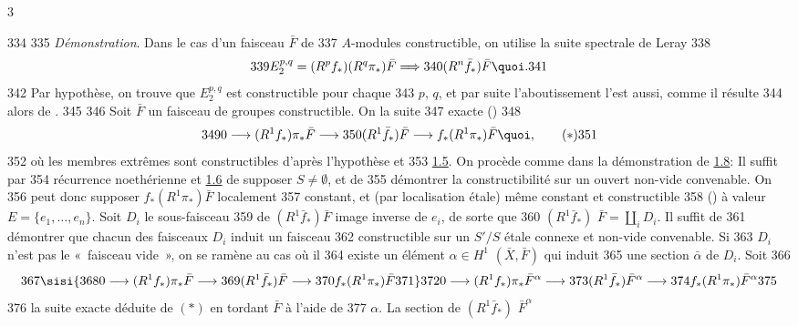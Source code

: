 3	\documentclass[10pt]{../fichiers-configuration-latex/smfart}
\begin{document}
   334	
   335		\emph{Démonstration}. Dans le cas d'un faisceau $\bar{F}$ de
   337	$A$-modules constructible, on utilise la suite spectrale de Leray
   338	$$
   339	E^{p,q}_2=(R^{p}f_{\ast})(R^{q}\pi_{\ast}) \bar{F}\Longrightarrow 
   340	(R^{n}\bar{f}_{\ast})\bar{F}{\quoi}.
   341	$$
   342	Par hypothèse, on trouve que $E^{p,q}_2$ est constructible pour chaque
   343	$p$, $q$, et par suite l'aboutissement l'est aussi, comme il résulte
   344	alors de .
   345	
   346	Soit $\bar{F}$ un faisceau de groupes constructible. On la suite
   347	exacte ()
   348	\begin{equation*}
   349	0\longrightarrow (R^{1}f_{\ast})\pi_{\ast}\bar{F}\longrightarrow
   350	(R^{1}\bar{f}_{\ast})\bar{F}\longrightarrow f_{\ast}(R^{1}\pi_{\ast})\bar{F}{\quoi},\tag{$\ast$}
   351	\end{equation*}
   352	où les membres extrêmes sont constructibles d'après l'hypothèse et
   353	\hyperref[XIV.lem1.5]{1.5}. On procède comme dans la démonstration de \hyperref[XIV.lem1.8]{1.8}: Il suffit par
   354	récurrence noethérienne et \hyperref[XIV.lem1.6]{1.6} de supposer $S\neq ∅$, et de
   355	démontrer la constructibilité sur un ouvert non-vide convenable. On
   356	peut donc supposer $f_{\ast}(R^{1}\pi_{\ast})\bar{F}$ localement
   357	constant, et (par localisation étale) même constant et constructible
   358	() à valeur $E=\{e_1,\ldots,e_n\}$. Soit $D_i$ le sous-faisceau
   359	de $(R^{1}\bar{f}_{\ast})\bar{F}$ image inverse de $e_i$, de sorte que
   360	$(R^{1}\bar{f}_{\ast})$ $\bar{F}=\coprod_{i}D_i$. Il suffit de
   361	démontrer que chacun des faisceaux $D_i$ induit un faisceau
   362	constructible sur un $S'/S$ étale connexe et non-vide convenable. Si
   363	$D_i$ n'est pas le « faisceau vide », on se ramène au cas où il
   364	existe un élément $\alpha \in H^{1}$ $(\bar{X},\bar{F})$ qui induit
   365	une section $\bar{\alpha}$ de $D_i$. Soit
   366	$$
   367	\sisi{
   368	0\longrightarrow (R^{1}f_{\ast})\pi_{\ast}\bar{F}\longrightarrow
   369	(R^{1}\bar{f}_{\ast})\bar{F}\longrightarrow
   370	f_{\ast}(R^{1}\pi_{\ast})\bar{F} 
   371	}
   372	{0\longrightarrow (R^{1}f_{\ast})\pi_{\ast}\bar{F}^\alpha \longrightarrow
   373	(R^{1}\bar{f}_{\ast})\bar{F}^\alpha \longrightarrow
   374	f_{\ast}(R^{1}\pi_{\ast})\bar{F}^\alpha}
   375	$$
   376	la suite exacte déduite de $(\ast)$ en tordant $\bar{F}$ à l'aide de
   377	$\alpha$. La section de $(R^{1}\bar{f}_{\ast})$ $\bar{F}^{\alpha}$
\end{document}
